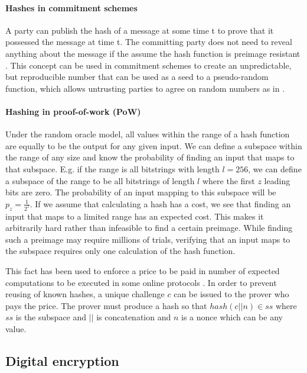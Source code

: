 \paragraph{Hashes in commitment schemes}
A party can publish the hash of a message at some time t to prove that it possessed the message at time t. The committing party does not need to reveal anything about the message if the assume the hash function is preimage resistant \cite[p.~187--189]{lindell2014introduction}. This concept can be used in commitment schemes \cite{brassard1988minimum} to create an unpredictable, but reproducible number that can be used as a seed to a pseudo-random function, which allows untrusting parties to agree on random numbers as in \cite{blum1983coin}.

\paragraph{Hashing in proof-of-work (PoW)}
Under the random oracle model, all values within the range of a hash function are equally to be the output for any given input. We can define a subspace within the range of any size and know the probability of finding an input that maps to that subspace. E.g. if the range is all bitstrings with length $l=256$, we can define a subspace of the range to be all bitstrings of length $l$ where the first $z$ leading bits are zero. The probability of an input mapping to this subspace will be $p_z=\frac{1}{2^z}$. If we assume that calculating a hash has a cost, we see that finding an input that maps to a limited range has an expected cost. This makes it arbitrarily hard rather than infeasible to find a certain preimage. While finding such a preimage may require millions of trials, verifying that an input maps to the subspace requires only one calculation of the hash function.  

This fact has been used to enforce a price to be paid in number of expected computations to be executed in some online protocols \cite{dwork_pricing_1993} \cite{back_hashcash-denial_2002}. In order to prevent reusing of known hashes, a unique challenge $c$ can be issued to the prover who pays the price. The prover must produce a hash so that $hash(c || n) \in ss$ where $ss$ is the subspace and $||$ is concatenation and $n$ is a nonce which can be any value. 


\subsection{Digital encryption}

